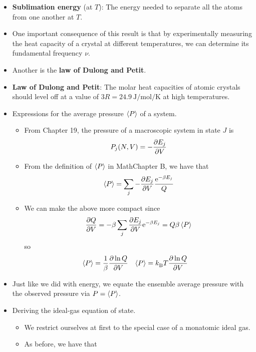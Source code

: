 \documentclass[../notes.tex]{subfiles}
\begin{document}
\begin{itemize}
    \item \textbf{Sublimation energy} (at $T$): The energy needed to separate all the atoms from one another at $T$.
    \item One important consequence of this result is that by experimentally measuring the heat capacity of a crystal at different temperatures, we can determine its fundamental frequency $\nu$.
    \item Another is the \textbf{law of Dulong and Petit}.
    \item \textbf{Law of Dulong and Petit}: The molar heat capacities of atomic crystals should level off at a value of $3R=\SI{24.9}{\joule\per\mole\per\kelvin}$ at high temperatures.
    \item Expressions for the average pressure $\prb{P}$ of a system.
    \begin{itemize}
        \item From Chapter 19, the pressure of a macroscopic system in state $J$ is
        \begin{equation*}
            P_j(N,V) = -\pdv{E_j}{V}
        \end{equation*}
        \item From the definition of $\prb{P}$ in MathChapter B, we have that
        \begin{equation*}
            \prb{P} = \sum_j-\pdv{E_j}{V}\frac{\e[-\beta E_j]}{Q}
        \end{equation*}
        \item We can make the above more compact since
        \begin{equation*}
            \pdv{Q}{V} = -\beta\sum_j\pdv{E_j}{V}\e[-\beta E_j] = Q\beta\prb{P}
        \end{equation*}
        so
        \begin{align*}
            \prb{P} &= \frac{1}{\beta}\pdv{\ln Q}{V}&
            \prb{P} &= \kB T\pdv{\ln Q}{V}
        \end{align*}
    \end{itemize}
    \item Just like we did with energy, we equate the ensemble average pressure with the observed pressure via $P=\prb{P}$.
    \item Deriving the ideal-gas equation of state.
    \begin{itemize}
        \item We restrict ourselves at first to the special case of a monatomic ideal gas.
        \item As before, we have that

\end{itemize}
\end{itemize}
\end{document}
